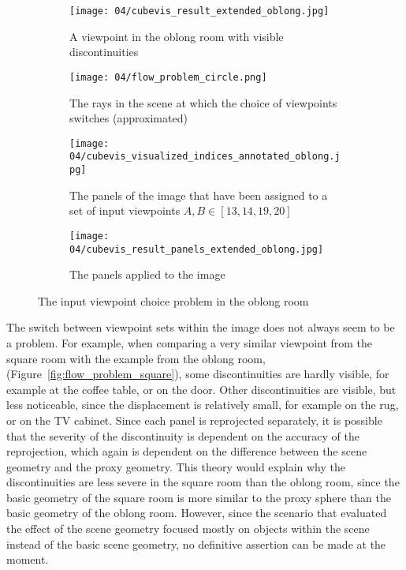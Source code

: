 \begin{figure}
\centering
    \hfill
    \begin{subfigure}[c]{0.45\textwidth}
            \centering
            \texttt{[image: 04/cubevis\_result\_extended\_oblong.jpg]}
            \caption{A viewpoint in the oblong room with visible discontinuities}
    \end{subfigure}
    \hfill
    \begin{subfigure}[c]{0.45\textwidth}
            \centering
            \texttt{[image: 04/flow\_problem\_circle.png]}
            \caption{The rays in the scene at which the choice of viewpoints switches (approximated)}
    \end{subfigure}
    \hfill

    \hfill
    \begin{subfigure}[c]{0.45\textwidth}
            \centering
            \texttt{[image: 04/cubevis\_visualized\_indices\_annotated\_oblong.jpg]}
            \caption{The panels of the image that have been assigned to a set of input viewpoints $A, B \in [13, 14, 19, 20]$}
    \end{subfigure}
    \hfill
    \begin{subfigure}[c]{0.45\textwidth}
            \centering
            \texttt{[image: 04/cubevis\_result\_panels\_extended\_oblong.jpg]}
            \caption{The panels applied to the image}
    \end{subfigure}
    \hfill
  \caption{The input viewpoint choice problem in the oblong room} \label{fig:flow_problem_oblong}
\end{figure}

The switch between viewpoint sets within the image does not always seem to be a problem. For example, when comparing a very similar viewpoint from the square room with the example from the oblong room, (Figure~\ref{fig:flow_problem_square}), some discontinuities are hardly visible, for example at the coffee table, or on the door. Other discontinuities are visible, but less noticeable, since the displacement is relatively small, for example on the rug, or on the TV cabinet.
Since each panel is reprojected separately, it is possible that the severity of the discontinuity is dependent on the accuracy of the reprojection, which again is dependent on the difference between the scene geometry and the proxy geometry.
This theory would explain why the discontinuities are less severe in the square room than the oblong room, since the basic geometry of the square room is more similar to the proxy sphere than the basic geometry of the oblong room.
However, since the scenario that evaluated the effect of the scene geometry focused mostly on objects within the scene instead of the basic scene geometry, no definitive assertion can be made at the moment. %

